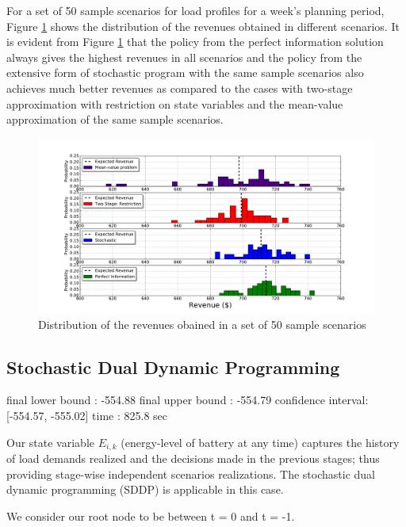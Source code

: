 \documentclass[11pt,twoside]{article}
\begin{document}
For a set of 50 sample scenarios for load profiles for a week's planning period, Figure \ref{fig:histogram} shows the distribution of the revenues obtained in different scenarios. It is evident from Figure \ref{fig:histogram} that the policy from the perfect information solution always gives the highest revenues in all scenarios and the policy from the extensive form of stochastic program with the same sample scenarios also achieves much better revenues as compared to the cases with two-stage approximation with restriction on state variables and the mean-value approximation of the same sample scenarios.
\begin{figure}[h!]
\begin{center}
\includegraphics[scale=0.42]
{Figures/Plots/fullproblem_stoch/histogram_costs.pdf} \caption{Distribution of the revenues obained in a set of 50 sample scenarios}\label{fig:histogram}\end{center}
\end{figure}
\FloatBarrier

\subsection{Stochastic Dual Dynamic Programming}
final lower bound : -554.88
final upper bound : -554.79 confidence interval: [-554.57, -555.02]
time : 825.8 sec

Our state variable $E_{i,k}$ (energy-level of battery at any time) captures the history of load demands realized and the decisions made in the previous stages; thus providing stage-wise independent scenarios realizations. The stochastic dual dynamic programming (SDDP) is applicable in this case. 

We consider our root node to be between t = 0 and t = -1. 
\end{document}
